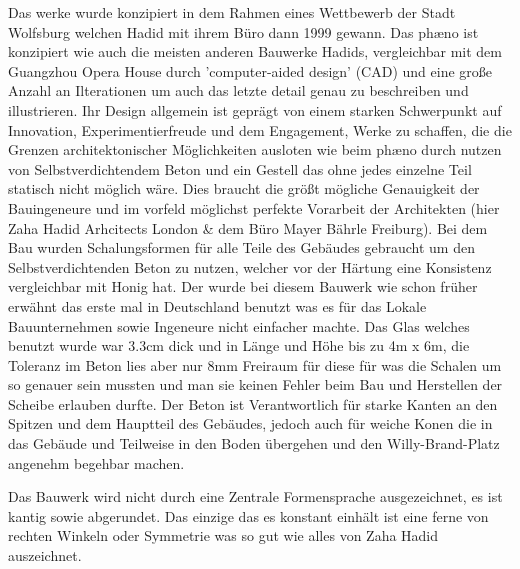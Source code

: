 \documentclass[a4paper, 12p]{article}
\begin{document}
Das werke wurde konzipiert in dem Rahmen eines Wettbewerb der Stadt Wolfsburg
welchen Hadid mit ihrem Büro dann 1999 gewann. Das phæno ist konzipiert wie auch
die meisten anderen Bauwerke Hadids, vergleichbar mit dem Guangzhou Opera House
durch 'computer-aided design' (CAD) und eine große Anzahl an Ilterationen um
auch das letzte detail genau zu beschreiben und illustrieren. Ihr Design 
allgemein ist geprägt von einem starken Schwerpunkt auf Innovation,
Experimentierfreude und dem Engagement, Werke zu schaffen, die die Grenzen
architektonischer Möglichkeiten ausloten wie beim phæno durch nutzen von
Selbstverdichtendem Beton und ein Gestell das ohne jedes einzelne Teil statisch
nicht möglich wäre. Dies braucht die größt mögliche Genauigkeit der Bauingeneure
und im vorfeld möglichst perfekte Vorarbeit der Architekten (hier Zaha Hadid
Arhcitects London \& dem Büro Mayer Bährle Freiburg).
Bei dem Bau wurden Schalungsformen für alle Teile des Gebäudes gebraucht um
den Selbstverdichtenden Beton zu nutzen, welcher vor der Härtung eine Konsistenz
vergleichbar mit Honig hat. Der wurde bei diesem Bauwerk wie schon früher
erwähnt das erste mal in Deutschland benutzt was es für das Lokale
Bauunternehmen sowie Ingeneure nicht einfacher machte. Das Glas welches benutzt
wurde war 3.3cm dick und in Länge und Höhe bis zu 4m x 6m, die Toleranz im
Beton lies aber nur 8mm Freiraum für diese für was die Schalen um so genauer
sein mussten und man sie keinen Fehler beim Bau und Herstellen der Scheibe
erlauben durfte. Der Beton ist Verantwortlich für starke Kanten an den Spitzen
und dem Hauptteil des Gebäudes, jedoch auch für weiche Konen die in das Gebäude
und Teilweise in den Boden übergehen und den Willy-Brand-Platz angenehm
begehbar machen.


Das Bauwerk wird nicht durch eine Zentrale Formensprache ausgezeichnet, es ist
kantig sowie abgerundet. Das einzige das es konstant einhält ist eine ferne von
rechten Winkeln oder Symmetrie was so gut wie alles von Zaha Hadid auszeichnet.
\end{document}
